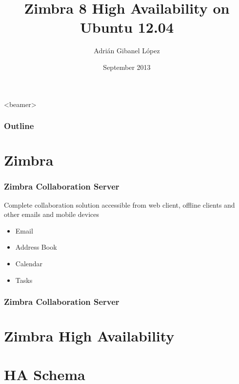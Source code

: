 \documentclass[10pt]{beamer}
\title[Zimbra 8 High Availability on Ubuntu 12.04]{Zimbra 8 High Availability on Ubuntu 12.04}
\author[Adri\'an Gibanel L\'opez] %
{Adri\'an Gibanel L\'opez}
\institute[Universitat de Lleida] %
{Universitat de Lleida}
\date[]{September 2013}
\begin{document}



\begin{frame}
  \titlepage
\end{frame}


  \begin{frame}<beamer>
    \frametitle{Outline}
    \tableofcontents[section]
  \end{frame}


\section {Zimbra}
\begin{frame}
\frametitle{Zimbra Collaboration Server}


\begin{block}{}
Complete collaboration solution accessible from web client, offline clients and other emails and mobile devices
\end{block}


\quad

\begin{itemize}

\item Email
\item Address Book
\item Calendar
\item Tasks

\end{itemize}

\end{frame}

\begin{frame}
\frametitle{Zimbra Collaboration Server}



\end{frame}
\section {Zimbra High Availability}
\section {HA Schema}
\end{document}
